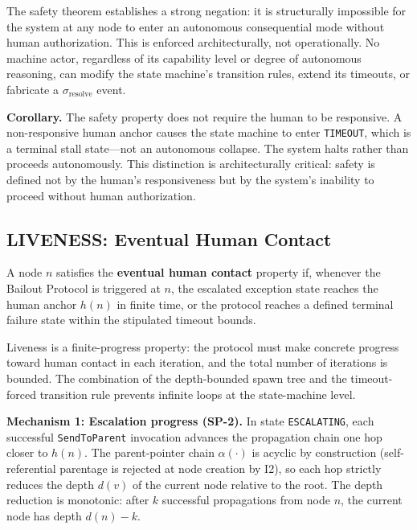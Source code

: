 The safety theorem establishes a strong negation: it is structurally impossible for the system at any node to enter an autonomous consequential mode without human authorization. This is enforced architecturally, not operationally. No machine actor, regardless of its capability level or degree of autonomous reasoning, can modify the state machine's transition rules, extend its timeouts, or fabricate a $\sigma_{\text{resolve}}$ event.

\textbf{Corollary.} The safety property does not require the human to be responsive. A non-responsive human anchor causes the state machine to enter \texttt{TIMEOUT}, which is a terminal stall state---not an autonomous collapse. The system halts rather than proceeds autonomously. This distinction is architecturally critical: safety is defined not by the human's responsiveness but by the system's inability to proceed without human authorization.

\subsection{LIVENESS: Eventual Human Contact}
\label{sec:liveness}

\begin{definition}
A node $n$ satisfies the \textbf{eventual human contact} property if, whenever the Bailout Protocol is triggered at $n$, the escalated exception state reaches the human anchor $h(n)$ in finite time, or the protocol reaches a defined terminal failure state within the stipulated timeout bounds.
\end{definition}

Liveness is a finite-progress property: the protocol must make concrete progress toward human contact in each iteration, and the total number of iterations is bounded. The combination of the depth-bounded spawn tree and the timeout-forced transition rule prevents infinite loops at the state-machine level.

\textbf{Mechanism 1: Escalation progress (SP-2).} In state \texttt{ESCALATING}, each successful \texttt{SendToParent} invocation advances the propagation chain one hop closer to $h(n)$. The parent-pointer chain $\alpha(\cdot)$ is acyclic by construction (self-referential parentage is rejected at node creation by I2), so each hop strictly reduces the depth $d(v)$ of the current node relative to the root. The depth reduction is monotonic: after $k$ successful propagations from node $n$, the current node has depth $d(n) - k$.

